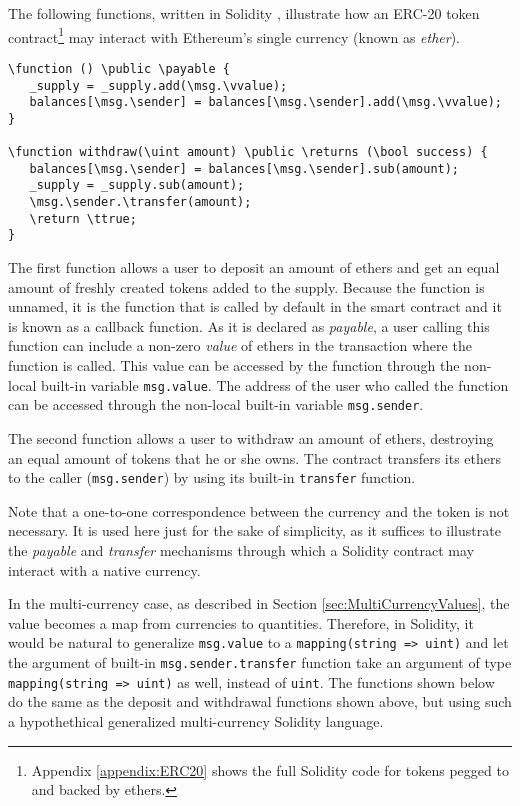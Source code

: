 \documentclass{llncs}
\newcommand{\blue}[1]{\textcolor[rgb]{0,0,1}{#1}}
\newcommand{\brown}[1]{\textcolor[rgb]{0.8,0.6,0.4}{#1}}
\newcommand{\green}[1]{\textcolor[rgb]{0.1,0.7,0.1}{#1}}
\newcommand{\verbsize}{\small}
\newcommand{\function}{\blue{function}}
\newcommand{\returns}{\blue{returns}}
\newcommand{\public}{\blue{public}}
\newcommand{\payable}{\blue{payable}}
\newcommand{\return}{\blue{return}}
\newcommand{\ttrue}{\green{true}}
\newcommand{\msg}{\green{msg}}
\newcommand{\vvalue}{\green{value}}
\newcommand{\sender}{\green{sender}}
\newcommand{\transfer}{\green{transfer}}
\newcommand{\uint}{\brown{uint}}
\newcommand{\bool}{\brown{bool}}
\begin{document}
The following functions, written in Solidity \cite{Solidity}, illustrate how an ERC-20 token contract\footnote{Appendix \ref{appendix:ERC20} shows the full Solidity code for tokens pegged to and backed by ethers.} may interact with Ethereum's single currency (known as \emph{ether}).

\begin{small}
\begin{Verbatim}[commandchars=\\\?\?,fontsize=\verbsize]
\function () \public \payable {
   _supply = _supply.add(\msg.\vvalue);
   balances[\msg.\sender] = balances[\msg.\sender].add(\msg.\vvalue);
}

\function withdraw(\uint amount) \public \returns (\bool success) {
   balances[\msg.\sender] = balances[\msg.\sender].sub(amount);
   _supply = _supply.sub(amount);
   \msg.\sender.\transfer(amount);
   \return \ttrue;
}
\end{Verbatim}
\end{small}



The first function allows a user to deposit an amount of ethers and get an equal amount of freshly created tokens added to the supply. Because the function is unnamed, it is the function that is called by default in the smart contract and it is known as a callback function. As it is declared as \emph{payable}, a user calling this function can include a non-zero \emph{value} of ethers in the transaction where the function is called. This value can be accessed by the function through the non-local built-in variable \verb+msg.value+. The address of the user who called the function can be accessed through the non-local built-in variable \verb+msg.sender+.

The second function allows a user to withdraw an amount of ethers, destroying an equal amount of tokens that he or she owns. The contract transfers its ethers to the caller (\verb+msg.sender+) by using its built-in \verb+transfer+ function.

Note that a one-to-one correspondence between the currency and the token is not necessary. It is used here just for the sake of simplicity, as it suffices to illustrate the \emph{payable} and \emph{transfer} mechanisms through which a Solidity contract may interact with a native currency.

In the multi-currency case, as described in Section \ref{sec:MultiCurrencyValues}, the value becomes a map from currencies to quantities. Therefore, in Solidity, it would be natural to generalize \verb+msg.value+ to a \verb+mapping(string => uint)+ and let the argument of built-in \verb+msg.sender.transfer+ function take an argument of type \verb+mapping(string => uint)+ as well, instead of \verb+uint+. The functions shown below do the same as the deposit and withdrawal functions shown above, but using such a hypothethical generalized multi-currency Solidity language.
\end{document}

